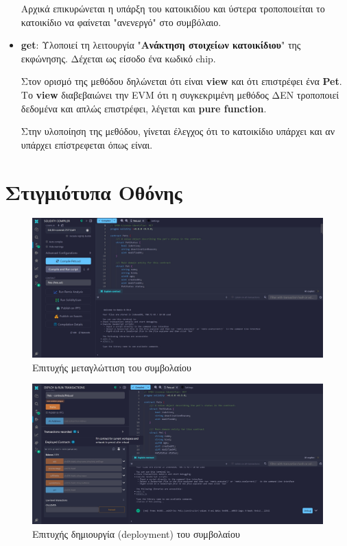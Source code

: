 \documentclass[12pt,a4paper]{article}
\begin{document}
\begin{itemize}
    Αρχικά επικυρώνεται η υπάρξη του κατοικιδίου και ύστερα τροποποιείται το κατοικίδιο να φαίνεται "ανενεργό" στο συμβόλαιο.

    \item \textbf{get}: Υλοποιεί τη λειτουργία "\textbf{Ανάκτηση στοιχείων κατοικίδιου}" της εκφώνησης. Δέχεται ως είσοδο ένα κωδικό chip.
    
    Στον ορισμό της μεθόδου δηλώνεται ότι είναι \textbf{view} και ότι επιστρέφει ένα \textbf{Pet}. Το \textbf{view} διαβεβαιώνει την EVM ότι η συγκεκριμένη μεθόδος ΔΕΝ τροποποιεί δεδομένα και απλώς επιστρέφει, λέγεται και \textbf{pure function}.
    
    Στην υλοποίηση της μεθόδου, γίνεται έλεγχος ότι το κατοικίδιο υπάρχει και αν υπάρχει επίστρεφεται όπως είναι.
\end{itemize}

\section{Στιγμιότυπα Οθόνης}

\begin{figure}[ht]
    \centering
    \includegraphics[width=\textwidth]{img/compile.jpg}
    \caption{Επιτυχής μεταγλώττιση του συμβολαίου}
\end{figure}

\begin{figure}[ht]
    \centering
    \includegraphics[width=\textwidth]{img/deploy.jpg}
    \caption{Επιτυχής δημιουργία (deployment) του συμβολαίου}
\end{figure}
\end{document}
